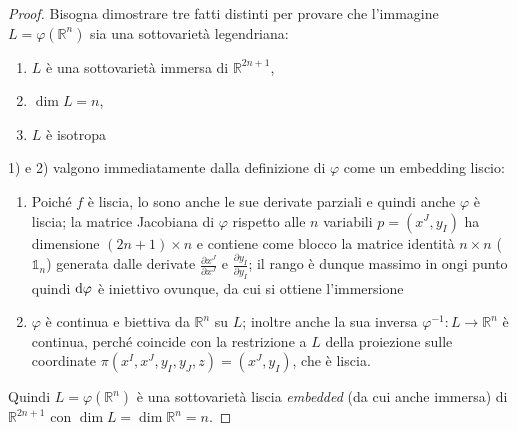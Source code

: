 \begin{proof}
    Bisogna dimostrare tre fatti distinti per provare che l'immagine $L = \varphi(\mathbb{R}^n)$ sia una sottovarietà legendriana:
    \begin{enumerate}
        \item $L$ è una sottovarietà immersa di $\mathbb{R}^{2n + 1}$,
        \item $\dim L = n$,
        \item $L$ è isotropa
    \end{enumerate}
    1) e 2) valgono immediatamente dalla definizione di $\varphi$ come un embedding liscio:
    \begin{enumerate}
        \item Poiché $f$ è liscia, lo sono anche le sue derivate parziali e quindi anche $\varphi$ è liscia; la matrice Jacobiana di $\varphi$ rispetto alle $n$ variabili $p = (x^J, y_I)$ ha dimensione $(2n + 1) \times n$ e contiene come blocco la matrice identità $n \times n$ ($\mathbb{1}_n$) generata dalle derivate $\frac{\partial x^J}{\partial x^J}$ e $\frac{\partial y_I}{\partial y_I}$; il rango è dunque massimo in ongi punto quindi $\odif{\varphi}$ è iniettivo ovunque, da cui si ottiene l'immersione \checkmark
        \item $\varphi$ è continua e biettiva da $\mathbb{R}^n$ su $L$; inoltre anche la sua inversa $\varphi^{-1} : L \longrightarrow \mathbb{R}^n$ è continua, perché coincide con la restrizione a $L$ della proiezione sulle coordinate $\pi(x^I, x^J, y_I, y_J, z)= (x^J, y_I)$, che è liscia. \checkmark
    \end{enumerate}
    Quindi $L = \varphi(\mathbb{R}^n)$ è una sottovarietà liscia \emph{embedded} (da cui anche immersa) di $\mathbb{R}^{2n + 1}$ con $\dim L = \dim \mathbb{R}^n = n$. \checkmark


\end{proof}
